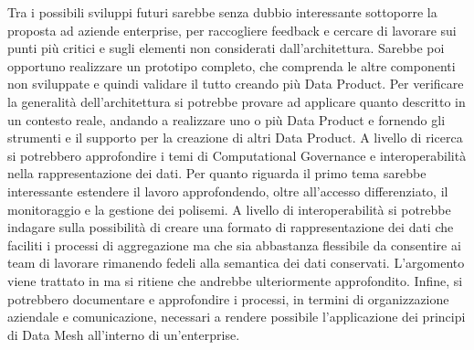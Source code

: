 \documentclass[12pt]{report}
\begin{document}
Tra i possibili sviluppi futuri sarebbe senza dubbio interessante sottoporre la proposta ad aziende enterprise, per raccogliere feedback e cercare di lavorare sui punti più critici e sugli elementi non considerati dall'architettura.
Sarebbe poi opportuno realizzare un prototipo completo, che comprenda le altre componenti non sviluppate e quindi validare il tutto creando più Data Product.
Per verificare la generalità dell'architettura si potrebbe provare ad applicare quanto descritto in un contesto reale, andando a realizzare uno o più Data Product e fornendo gli strumenti e il supporto per la creazione di altri Data Product.
A livello di ricerca si potrebbero approfondire i temi di Computational Governance e interoperabilità nella rappresentazione dei dati.
Per quanto riguarda il primo tema sarebbe interessante estendere il lavoro approfondendo, oltre all'accesso differenziato, il monitoraggio e la gestione dei polisemi.
A livello di interoperabilità si potrebbe indagare sulla possibilità di creare una formato di rappresentazione dei dati che faciliti i processi di aggregazione ma che sia abbastanza flessibile da consentire ai team di lavorare rimanendo fedeli alla semantica dei dati conservati.
L'argomento viene trattato in \cite{dehghani_data_2022} ma si ritiene che andrebbe ulteriormente approfondito.
Infine, si potrebbero documentare e approfondire i processi, in termini di organizzazione aziendale e comunicazione, necessari a rendere possibile l'applicazione dei principi di Data Mesh all'interno di un'enterprise.
\printbibliography
\end{document}
